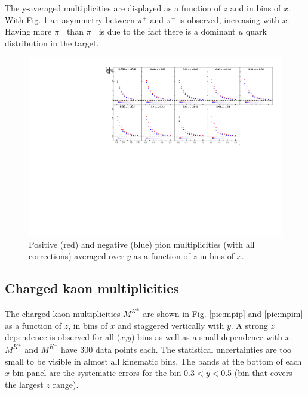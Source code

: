 The y-averaged multiplicities are displayed as a function of $z$ and in bins of $x$. With Fig. \ref{pic:mpiyavg} an asymmetry between $\pi^+$ and $\pi^-$ is observed, increasing with $x$. Having more $\pi^+$ than $\pi^-$ is due to the fact there is a dominant $u$ quark distribution in the target.

\begin{figure}[!h]
  \centering
	\includegraphics[scale=0.85]{./gfx/piyavg.pdf}
	\caption{Positive (red) and negative (blue) pion multiplicities (with all corrections) averaged over $y$ as a function of $z$ in bins of $x$.}
	\label{pic:mpiyavg}
\end{figure}

\newpage

\subsection{Charged kaon multiplicities}

The charged kaon multiplicities $M^{K^{\pm}}$ are shown in Fig. \ref{pic:mpip} and \ref{pic:mpim} as a function of $z$, in bins of $x$ and staggered vertically with $y$. A strong $z$ dependence is observed for all ($x$,$y$) bins as well as a small dependence with $x$. $M^{K^+}$ and $M^{K^-}$ have 300 data points each. The statistical uncertainties are too small to be visible in almost all kinematic bins. The bands at the bottom of each $x$ bin panel are the systematic errors for the bin 0.3$< y <$0.5 (bin that covers the largest $z$ range).

